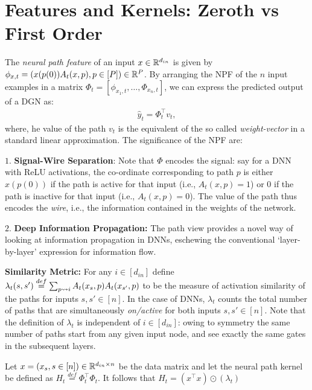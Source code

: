 \section{Features and Kernels: Zeroth vs First Order}
The \emph{neural path feature} of an input $x\in \mathbb{R}^{d_{in}}$ is given by $\phi_{x,t}=(x(p(0))A_t(x,p) ,p\in[P])\in\mathbb{R}^P$. By arranging the NPF of the $n$ input examples in a matrix $\Phi_t=\left[\phi_{x_1,t},\ldots, \Phi_{x_n,t}\right]$, we can express the predicted output of a DGN as: \begin{align}\hat{y}_t=\Phi_t^\top v_t,\end{align}
where, he value of the path $v_t$ is the equivalent of the so called \emph{weight-vector} in a standard linear approximation. The significance of the NPF are:

$1.$ \textbf{Signal-Wire Separation}: Note that $\Phi$ encodes the signal: say for a DNN with ReLU activations, the co-ordinate corresponding to path $p$ is either $x(p(0))$ if the path is active for that input (i.e., $A_t(x,p)=1$) or $0$ if the path is inactive for that input  (i.e., $A_t(x,p)=0$). The value of the path thus encodes the \emph{wire}, i.e., the information contained in the weights of the network. 

$2.$ \textbf{Deep Information Propagation:} The path view provides a novel way of looking at information propagation in DNNs, eschewing the conventional `layer-by-layer' expression for information flow.

\textbf{Similarity Metric:} For any $i\in [d_{in}]$ define $\lambda_t(s,s')\stackrel{def}{=}\sum_{p\rightsquigarrow i} A_t(x_s,p) A_t(x_{s'},p)$ to be the measure of activation similarity of the paths for inputs $s,s'\in[n]$. In the case of DNNs, $\lambda_t$ counts the total number of paths that are simultaneously \emph{on/active} for both inputs $s,s'\in[n]$. Note that the definition of $\lambda_t$ is independent of $i\in [d_{in}]$: owing to symmetry the same number of paths start from any given input node, and see exactly the same gates in the subsequent layers.

\begin{lemma} Let $x=(x_s,s\in [n])\in\mathbb{R}^{d_{in}\times n}$ be the data matrix and let the neural path kernel be defined as $H_t\stackrel{def}=\Phi^\top_t\Phi_t$. It follows that $H_t= (x^\top x)\odot(\lambda_t)$ \end{lemma}





